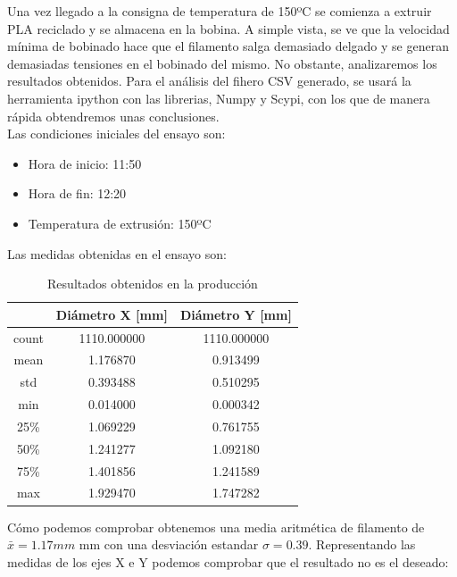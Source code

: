 Una vez llegado a la consigna de temperatura de 150ºC se comienza a extruir PLA reciclado y se almacena en la bobina. A simple vista, se ve que la velocidad mínima de bobinado hace que el filamento salga demasiado delgado y se generan demasiadas tensiones en el bobinado del mismo. No obstante, analizaremos los resultados obtenidos. Para el análisis del fihero CSV generado, se usará la herramienta ipython con las librerias, Numpy y Scypi, con los que de manera rápida obtendremos unas conclusiones.\\

Las condiciones iniciales del ensayo son:

	\begin{itemize}
		\item Hora de inicio: 11:50
		\item Hora de fin: 12:20
		\item Temperatura de extrusión: 150ºC
	\end{itemize}

Las medidas obtenidas en el ensayo son:

\begin{table}[H]
\centering
\begin{tabular}{ccc}
{\bf } & {\bf Diámetro X [mm]} & {\bf Diámetro Y [mm]} \\ \hline
count & 1110.000000 & 1110.000000 \\
mean & 1.176870 & 0.913499 \\
std & 0.393488 & 0.510295 \\
min & 0.014000 & 0.000342 \\
25\% & 1.069229 & 0.761755 \\
50\% & 1.241277 & 1.092180 \\
75\% & 1.401856 & 1.241589 \\
max & 1.929470 & 1.747282
\end{tabular}
\caption{Resultados obtenidos en la producción}
\label{tab:result1}
\end{table}

Cómo podemos comprobar obtenemos una media aritmética de filamento de $ \bar{x} = 1.17mm $  mm con una desviación estandar  $\sigma = 0.39$. Representando las medidas de los ejes X e Y podemos comprobar que el resultado no es el deseado:

